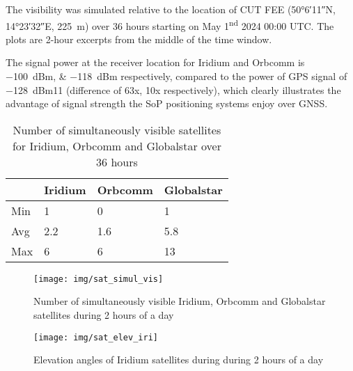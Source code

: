 The visibility was simulated relative to the location of CUT FEE (\ang{50;6;11}N, \ang{14;23;32}E, \qty{225}{m}) over 36 hours starting on May 1\textsuperscript{nd} 2024 00:00 UTC. The plots are 2-hour excerpts from the middle of the time window.

The signal power at the receiver location for Iridium and Orbcomm is \qtylist{-100;-118}{dBm} respectively, compared to the power of GPS signal of \qty{-128}{dBm}\citep{pos04}{11} (difference of 63x, 10x respectively), which clearly illustrates the advantage of signal strength the SoP positioning systems enjoy over GNSS.

\begin{table}
    \centering
    \begin{tabular}{llll}
 & Iridium & Orbcomm & Globalstar \\ \hline
Min & 1 & 0 & 1 \\
Avg & 2.2 & 1.6 & 5.8 \\
Max & 6 & 6 & 13 \\
    \end{tabular}
    \caption{Number of simultaneously visible satellites for Iridium, Orbcomm and Globalstar over 36 hours}
    \label{t_sat_simul_vis}
\end{table}

\begin{figure}
    \centering
    \texttt{[image: img/sat\_simul\_vis]}
    \caption{Number of simultaneously visible Iridium, Orbcomm and Globalstar satellites during 2 hours of a day}
    \label{f_sat_simul_vis}
\end{figure}

\begin{figure}
    \centering
    \texttt{[image: img/sat\_elev\_iri]}
    \caption{Elevation angles of Iridium satellites during during 2 hours of a day}
    \label{f_sat_elev_iri}
\end{figure}

